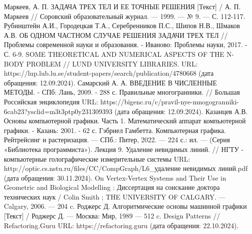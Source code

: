 \begin{thebibliography}{}
	 Маркеев, А. П. ЗАДАЧА ТРЕХ ТЕЛ И ЕЕ ТОЧНЫЕ РЕШЕНИЯ [Текст] / А. П. Маркеев // Соровский образовательный журнал. — 1999. — № 9. — С. 112-117.
	 Рубинштейн А.И., Городецкая Т.А., Серебренников П.С., Шипов Н.В., Шмаков А.В. ОБ ОДНОМ ЧАСТНОМ СЛУЧАЕ РЕШЕНИЯ ЗАДАЧИ ТРЕХ ТЕЛ // Проблемы современной науки и образования. - Иваново: Проблемы науки, 2017. - С. 6-9.
	 SOME THEORETICAL AND NUMERICAL ASPECTS OF THE N-BODY PROBLEM // LUND UNIVERSITY LIBRARIES. URL: https://lup.lub.lu.se/student-papers/search/publication/4780668 (дата обращения: 12.09.2024).
	 Самарский А. А. ВВЕДЕНИЕ В ЧИСЛЕННЫЕ МЕТОДЫ. - СПб: Лань, 2009. - 288 с.
	 Правильные многогранники. // Большая Российская энциклопедия URL: https://bigenc.ru/c/pravil-nye-mnogogranniki-6cab23?ysclid=m3t3ptp0y231309393 (дата обращения: 12.09.2024).
	 Казанцев А.В. Основы компьютерной графики. Часть 1. Математический аппарат компьютерной графики. - Казань: 2001. - 62 с.
	 Гэбриел Гамбетта. Компьютерная графика. Рейтрейсинг и растеризация. — СПб.: Питер, 2022. — 224 с.: ил. — (Серия «Библиотека программиста»).
	 Лекция 9. Удаление невидимых линий. // НГТУ - компьютерные голографические измерительные системы URL: http://optic.cs.nstu.ru/files/CC/CompGraph/L6\_удаление невидимых линий.pdf (дата обращения: 30.11.2024).
	 On Vertex-Vertex Systems and Their Use in Geometric and Biological Modelling : Диссертация на соискание доктора технических наук / Colin Smith ; THE UNIVERSITY OF CALGARY. — Calgary, 2006. — 204 c.
	 Роджерс Д. Алгоритмические основы машинной графики [Текст] / Роджерс Д. — Москва: Мир, 1989 — 512 c.
	 Design Patterns // Refactoring.Guru URL: https://refactoring.guru (дата обращения: 22.10.2024).
\end{thebibliography}
